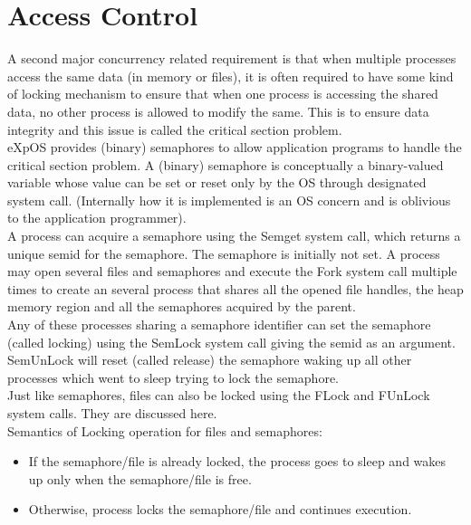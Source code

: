 \section{Access Control}
A second major concurrency related requirement is that when multiple processes access the same data (in memory or files), it is often required to have some kind of locking mechanism to ensure that when one process is accessing the shared data, no other process is allowed to modify the same. This is to ensure data integrity and this issue is called the critical section problem.
\\
eXpOS provides (binary) semaphores to allow application programs to handle the critical section problem. A (binary) semaphore is conceptually a binary-valued variable whose value can be set or reset only by the OS through designated system call. (Internally how it is implemented is an OS concern and is oblivious to the application programmer).
\\
A process can acquire a semaphore using the Semget system call, which returns a unique semid for the semaphore. The semaphore is initially not set. A process may open several files and semaphores and execute the Fork system call multiple times to create an several process that shares all the opened file handles, the heap memory region and all the semaphores acquired by the parent.
\\
Any of these processes sharing a semaphore identifier can set the semaphore (called locking) using the SemLock system call giving the semid as an argument. SemUnLock will reset (called release) the semaphore waking up all other processes which went to sleep trying to lock the semaphore.
\\
Just like semaphores, files can also be locked using the FLock and FUnLock system calls. They are discussed here.
\\ 
Semantics of Locking operation for files and semaphores:
\begin{itemize}

\item If the semaphore/file is already locked, the process goes to sleep and wakes up only when the semaphore/file is free.
\item Otherwise, process locks the semaphore/file and continues execution.

\end{itemize}